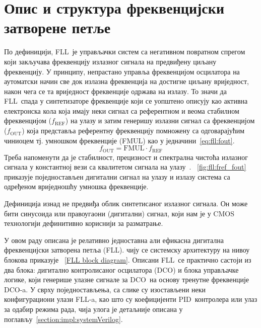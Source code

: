 \documentclass[master]{finthesis}
\def \FLL  {FLL} %
\def \DCO  {DCO} %
\def \PID  {PID} %
\begin{document}
\section{Опис и структура фреквенцијски затворене петље} \label{FLL structure}
По дефиницији, \FLL\ је управљачки систем са негативном повратном спрегом који закључава фреквенцију излазног сигнала на предвиђену циљану фреквенцију. У принципу, непрастано управља фреквенцијом осцилатора на аутоматски начин све док излазна фреквенција на достигне циљану вриједност, након чега се та вриједност фреквенције одржава на излазу. То значи да \FLL\ спада у синтетизаторе фреквенције који се уопштено описују као активна електронска кола која имају неки сигнал са референтном и веома стабилном фреквенцијом ($f_\text{REF}$) на улазу и затим генеришу излазни сигнал са фреквенцијом ($f_\text{OUT}$) која представља референтну фреквенцију помножену са одговарајућим чиниоцем тј. умношком фреквенције (FMUL) као у једначини~\ref{eq:fll:fout}.
\begin{equation}
	\label{eq:fll:fout}
	f_\text{OUT} = \text{FMUL} \cdot f_\text{REF}
\end{equation}
Треба напоменути да је стабилност, прецизност и спектрална чистоћа излазног сигнала у константној вези са квалитетом сигнала на улазу~\cite{Staszewski:FREQUENCY_SYNTHESIZER_CMOS_2005}. \figurename~\ref{fig:fll:fref_fout} приказује поједностављен дигитални сигнал на улазу и излазу система са одређеном вриједношћу умношка фреквенције. \par

Дефиниција изнад не предвиђа облик синтетисаног излазног сигнала. Он може бити синусоида или правоугаони (дигитални) сигнал, који нам је у CMOS технологији дефинитивно кориснији за разматрање. \par 
У овом раду описана је релативно једноставна али ефикасна дигитална фреквенцијски затворена петља (\FLL). чију се системску архитектуру на нивоу блокова приказује \figurename~\ref{FLL block diagram}. Описани \FLL\ се практично састоји из два блока: дигитално контролисаног осцилатора (\DCO) и блока управљачке логике, који генерише улазне сигнале за \DCO\ на основу тренутне фреквенције \DCO-a. У сврху поједностављења, са слике су изостављени неки конфигурациони улази \FLL-a, као што су коефицијенти \PID\ контролера или улаз за одабир режима рада, чија улога је детаљније описана у поглављу~\ref{section:impl:systemVerilog}. 
\end{document}
